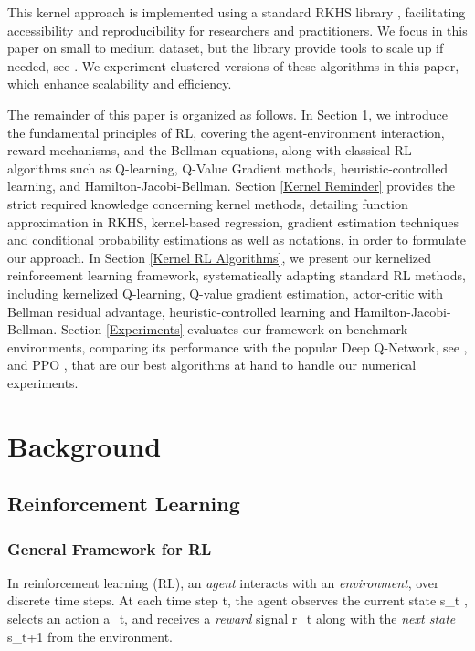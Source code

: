 \documentclass[
]{article}
\def\({}%
\def\){}%
\numberwithin{equation}{section}
\begin{document}
This kernel approach is implemented using a standard RKHS library \cite{codpy}, facilitating accessibility and reproducibility for researchers and practitioners. We focus in this paper on small to medium dataset, but the library \cite{codpy} provide tools to scale up if needed, see \cite{LeMeMi:2024}. We experiment clustered versions of these algorithms in this paper, which enhance scalability and efficiency.

The remainder of this paper is organized as follows. In Section \ref{Background}, we introduce the fundamental principles of RL, covering the agent-environment interaction, reward mechanisms, and the Bellman equations, along with classical RL algorithms such as Q-learning, Q-Value Gradient methods, heuristic-controlled learning, and Hamilton-Jacobi-Bellman. Section \ref{Kernel Reminder} provides the strict required knowledge concerning kernel methods, detailing function approximation in RKHS, kernel-based regression, gradient estimation techniques and conditional probability estimations as well as notations, in order to formulate our approach. In Section \ref{Kernel RL Algorithms}, we present our kernelized reinforcement learning framework, systematically adapting standard RL methods, including kernelized Q-learning, Q-value gradient estimation, actor-critic with Bellman residual advantage, heuristic-controlled learning and Hamilton-Jacobi-Bellman. Section \ref{Experiments} evaluates our framework on benchmark environments, comparing its performance with the popular Deep Q-Network, see \cite{DQN}, and PPO \cite{PPO}, that are our best algorithms at hand to handle our numerical experiments.


\hypertarget{Background}{%
\section{Background}\label{Background}}

\hypertarget{Reinforcement-learning}{%
\subsection{Reinforcement Learning}\label{Reinforcement-learning}}

\hypertarget{General framework for RL}{%
\subsubsection{General Framework for RL}\label{General framework for RL}}

In reinforcement learning (RL), an \emph{agent} interacts with an
\emph{environment}, over discrete time steps. At each time step \(t\),
the agent observes the current state \(s_t \),
selects an action \(a_t\),
and receives a \emph{reward} signal \(r_t \) along with the
\emph{next state} \(s_{t+1}\) from the environment. 
\end{document}
